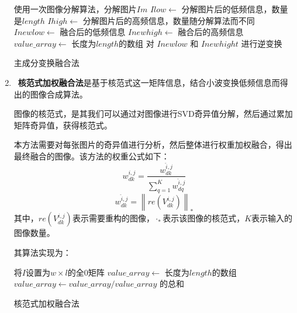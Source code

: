\documentclass{xduugthesis}
\begin{document}
\begin{enumerate}
\begin{algorithm}
	使用一次图像分解算法，分解图片$Im$\;
	$Ilow\leftarrow$ 分解图片后的低频信息，数量是$length$\;
	$Ihigh\leftarrow$ 分解图片后的高频信息，数量随分解算法而不同\;
	$Inewlow\leftarrow$ 融合后的低频信息\;
	$Inewhigh\leftarrow$ 融合后的高频信息\;
	$value\_array\leftarrow$ 长度为$length$的数组\;
	对 $Inewlow$ 和 $Inewhight$ 进行逆变换\;
	\caption{主成分变换融合法}
\end{algorithm}
\DecMargin{1em}
\item \textbf{核范式加权融合法}是基于核范式这一矩阵信息，结合小波变换低频信息而得出的图像合成算法。\par
图像的核范式，是其我们可以通过对图像进行SVD奇异值分解，然后通过累加矩阵奇异值，获得核范式。\par
本方法需要对每张图片的奇异值进行分析，然后整体进行权重加权融合，得出最终融合的图像。该方法的权重公式\cite{Softmax_Merge}如下：
$$w_{dk}^{i,j}=\frac{w_{dk}^{\hat{i},j}}{\sum_{q=1}^{K}w_{dq}^{\hat{i},j}}$$
$$w_{dk}^{\hat{i},j}={\left\| re\left(V_{dk}^{i,j}\right)\right\|}_*$$
其中，$re\left(V_{dk}^{i,j}\right)$表示需要重构的图像，$\cdot_*$表示该图像的核范式，$K$表示输入的图像数量。\par
其算法实现为：\par
\IncMargin{1em}
\begin{algorithm}
	将$I$设置为$w\times l$的全0矩阵\;
	$value\_array\leftarrow$ 长度为$length$的数组\;
	$value\_array \leftarrow value\_array / value\_array$ 的总和\;
	\caption{核范式加权融合法}
\end{algorithm}
\DecMargin{1em}
\end{enumerate}
\end{document}
